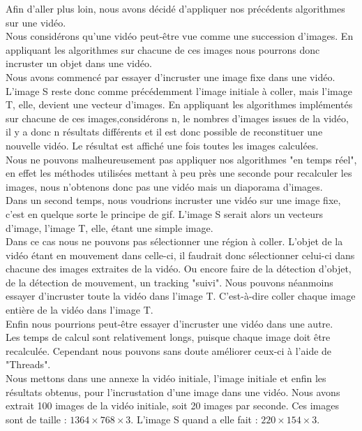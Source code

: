 Afin d'aller plus loin, nous avons décidé d'appliquer nos précédents algorithmes sur une vidéo. \\
Nous considérons qu'une vidéo peut-être vue comme une succession d'images. En appliquant les algorithmes sur chacune de ces images nous pourrons donc incruster un objet dans une vidéo. \\
Nous avons commencé par essayer d'incruster une image fixe dans une vidéo. 
L'image S reste donc comme précédemment l'image initiale à coller, mais l'image T, elle, devient une vecteur d'images. En appliquant les algorithmes implémentés sur chacune de ces images,considérons n, le nombres d'images issues de la vidéo, il y a donc n résultats différents et il est donc possible de reconstituer une nouvelle vidéo.  Le résultat est affiché une fois toutes les images calculées. \\ Nous ne pouvons malheureusement pas appliquer nos algorithmes "en temps réel", en effet les méthodes utilisées mettant à peu près une seconde pour recalculer les images, nous n'obtenons donc pas une vidéo mais un diaporama d'images. \\
Dans un second temps, nous voudrions incruster une vidéo sur une image fixe, c'est en quelque sorte le principe de gif. L'image S serait alors un vecteurs d'image, l'image T, elle, étant une simple image. \\ Dans ce cas nous ne pouvons pas sélectionner une région à coller. L'objet de la vidéo étant en mouvement dans celle-ci, il faudrait donc sélectionner celui-ci dans chacune des images extraites de la vidéo. Ou encore faire de la détection d'objet, de la détection de mouvement, un tracking "suivi". Nous pouvons néanmoins essayer d'incruster toute la vidéo dans l'image T.  C'est-à-dire coller chaque image entière de la vidéo dans l'image T.\\
Enfin nous pourrions peut-être essayer d'incruster une vidéo dans une autre. \\
Les temps de calcul sont relativement longs, puisque chaque image doit être recalculée. Cependant nous pouvons sans doute améliorer ceux-ci à l'aide de "Threads". \\
Nous mettons dans une annexe la vidéo initiale, l'image initiale et enfin les résultats obtenus, pour l'incrustation d'une image dans une vidéo. 
Nous avons extrait 100 images de la vidéo initiale, soit 20 images par seconde. Ces images sont de taille : $1364 \times 768 \times 3$.  L'image S quand a elle fait : $220 \times 154 \times 3$.